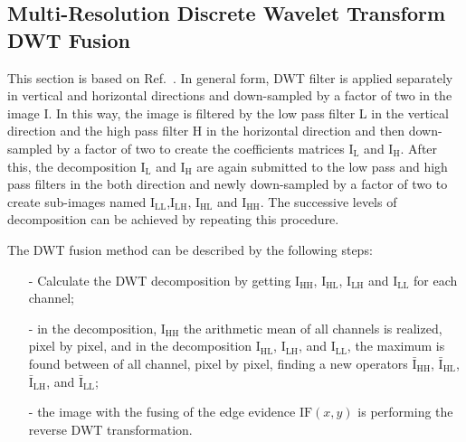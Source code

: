 \documentclass[journal]{IEEEtran}
\begin{document}
\subsection{Multi-Resolution Discrete Wavelet Transform DWT Fusion} 
This section is based on Ref.~\cite{n_r}. In general form, DWT filter is applied separately in vertical and horizontal directions and down-sampled by a factor of two in the image I. In this way, the image is filtered by the low pass filter L in the vertical direction and the high pass filter H in the horizontal direction and then down-sampled by a factor of two to create the coefficients matrices $\text{I}_\text{L}$ and $\text{I}_\text{H}$. After this, the decomposition $\text{I}_\text{L}$ and $\text{I}_\text{H}$ are again submitted to the low pass and high pass filters in the both direction and newly down-sampled by a factor of two to create sub-images named $\text{I}_\text{LL}$,$\text{I}_\text{LH}$, $\text{I}_\text{HL}$ and $\text{I}_\text{HH}$. The successive levels of decomposition can be achieved by repeating this procedure.

The DWT fusion method can be described by the following steps:
\begin{itemize}
\item[-] Calculate the DWT decomposition by getting $\text{I}_\text{HH}$, $\text{I}_\text{HL}$, $\text{I}_\text{LH}$ and $\text{I}_\text{LL}$ for each channel;
\item[-] in the decomposition, $\text{I}_\text{HH}$ the arithmetic mean of all channels is realized, pixel by pixel, and in the decomposition $\text{I}_\text{HL}$, $\text{I}_\text{LH}$, and $\text{I}_\text{LL}$, the maximum is found between of all channel, pixel by pixel, finding a new operators $\bar{\text{I}}_\text{HH}$, $\bar{\text{I}}_\text{HL}$, $\bar{\text{I}}_\text{LH}$, and $\bar{\text{I}}_\text{LL}$;
\item[-] the image with the fusing of the edge evidence $\text{IF}(x,y)$ is performing the reverse DWT transformation.  
\end{itemize}
\end{document}
